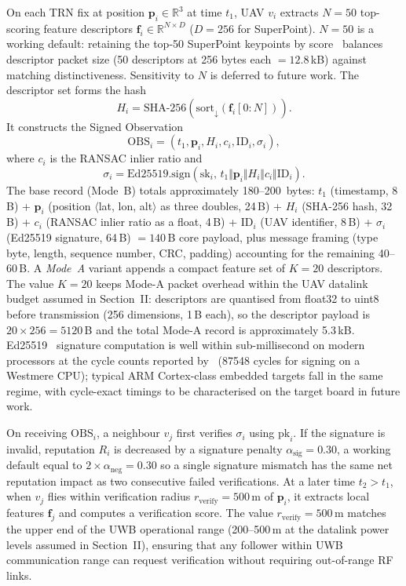 \documentclass[journal,10pt,twocolumn]{IEEEtran}
\begin{document}
On each TRN fix at position $\mathbf{p}_i \in \mathbb{R}^3$ at time $t_1$, UAV $v_i$ extracts $N=50$ top-scoring feature descriptors $\mathbf{f}_i \in \mathbb{R}^{N\times D}$ ($D{=}256$ for SuperPoint). $N=50$ is a working default: retaining the top-50 SuperPoint keypoints by score~\cite{detone2018superpoint} balances descriptor packet size (50 descriptors at 256 bytes each $= 12.8$\,kB) against matching distinctiveness. Sensitivity to $N$ is deferred to future work. The descriptor set forms the hash
\begin{equation}
H_i = \mathrm{SHA\text{-}256}\!\left(\mathrm{sort}_\downarrow(\mathbf{f}_i[0\!:\!N])\right).
\end{equation}
It constructs the Signed Observation
\begin{equation}
\mathrm{OBS}_i = \left(t_1, \mathbf{p}_i, H_i, c_i, \mathrm{ID}_i, \sigma_i\right),
\end{equation}
where $c_i$ is the RANSAC inlier ratio and
\begin{equation}
\sigma_i = \mathrm{Ed25519.sign}\!\left(\mathrm{sk}_i,\, t_1 \Vert \mathbf{p}_i \Vert H_i \Vert c_i \Vert \mathrm{ID}_i\right).
\end{equation}
The base record (Mode~B) totals approximately 180--200~bytes: $t_1$ (timestamp, 8\,B) + $\mathbf{p}_i$ (position $\langle$lat, lon, alt$\rangle$ as three doubles, 24\,B) + $H_i$ (SHA-256 hash, 32\,B) + $c_i$ (RANSAC inlier ratio as a float, 4\,B) + $\mathrm{ID}_i$ (UAV identifier, 8\,B) + $\sigma_i$ (Ed25519 signature, 64\,B) $= 140$\,B core payload, plus message framing (type byte, length, sequence number, CRC, padding) accounting for the remaining 40--60\,B. A \emph{Mode~A} variant appends a compact feature set of $K=20$ descriptors. The value $K=20$ keeps Mode-A packet overhead within the UAV datalink budget assumed in Section~II: descriptors are quantised from float32 to uint8 before transmission (256 dimensions, 1\,B each), so the descriptor payload is $20 \times 256 = 5120$\,B and the total Mode-A record is approximately 5.3\,kB. Ed25519~\cite{bernstein2012ed25519} signature computation is well within sub-millisecond on modern processors at the cycle counts reported by~\cite{bernstein2012ed25519} (87548 cycles for signing on a Westmere CPU); typical ARM Cortex-class embedded targets fall in the same regime, with cycle-exact timings to be characterised on the target board in future work.

On receiving $\mathrm{OBS}_i$, a neighbour $v_j$ first verifies $\sigma_i$ using $\mathrm{pk}_i$. If the signature is invalid, reputation $R_i$ is decreased by a signature penalty $\alpha_\text{sig} = 0.30$, a working default equal to $2 \times \alpha_\text{neg} = 0.30$ so a single signature mismatch has the same net reputation impact as two consecutive failed verifications. At a later time $t_2 > t_1$, when $v_j$ flies within verification radius $r_\text{verify} = 500$\,m of $\mathbf{p}_i$, it extracts local features $\mathbf{f}_j$ and computes a verification score. The value $r_\text{verify} = 500$\,m matches the upper end of the UWB operational range (200--500\,m at the datalink power levels assumed in Section~II), ensuring that any follower within UWB communication range can request verification without requiring out-of-range RF links.
\end{document}
